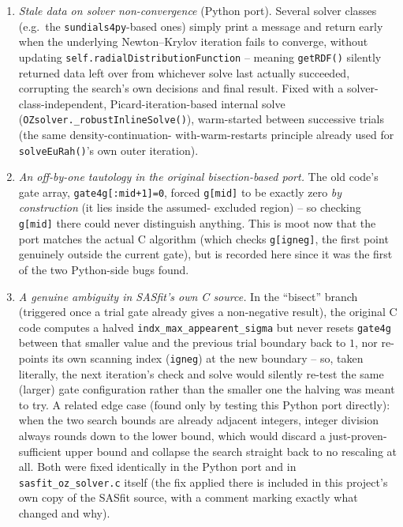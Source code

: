 \documentclass[11pt,a4paper]{article}
\newcommand{\code}[1]{\texttt{#1}}
\begin{document}
\begin{enumerate}[nosep]
  \item \emph{Stale data on solver non-convergence} (Python port). Several
    solver classes (e.g.\ the \code{sundials4py}-based ones) simply print a
    message and return early when the underlying Newton--Krylov iteration
    fails to converge, without updating \code{self.radialDistributionFunction}
    -- meaning \code{getRDF()} silently returned data left over from
    whichever solve last actually succeeded, corrupting the search's own
    decisions and final result. Fixed with a solver-class-independent,
    Picard-iteration-based internal solve (\code{OZsolver.\_robustInlineSolve()}),
    warm-started between successive trials (the same density-continuation-
    with-warm-restarts principle already used for \code{solveEuRah()}'s own
    outer iteration).
  \item \emph{An off-by-one tautology in the original bisection-based port.}
    The old code's gate array, \code{gate4g[:mid+1]=0}, forced \code{g[mid]}
    to be exactly zero \emph{by construction} (it lies inside the assumed-
    excluded region) -- so checking \code{g[mid]} there could never
    distinguish anything. This is moot now that the port matches the actual
    C algorithm (which checks \code{g[igneg]}, the first point genuinely
    outside the current gate), but is recorded here since it was the first
    of the two Python-side bugs found.
  \item \emph{A genuine ambiguity in SASfit's own C source.} In the
    ``bisect'' branch (triggered once a trial gate already gives a
    non-negative result), the original C code computes a halved
    \code{indx\_max\_appearent\_sigma} but never resets \code{gate4g} between
    that smaller value and the previous trial boundary back to $1$, nor
    re-points its own scanning index (\code{igneg}) at the new boundary --
    so, taken literally, the next iteration's check and solve would silently
    re-test the same (larger) gate configuration rather than the smaller one
    the halving was meant to try. A related edge case (found only by testing
    this Python port directly): when the two search bounds are already
    adjacent integers, integer division always rounds down to the lower
    bound, which would discard a just-proven-sufficient upper bound and
    collapse the search straight back to no rescaling at all. Both were
    fixed identically in the Python port and in \code{sasfit\_oz\_solver.c}
    itself (the fix applied there is included in this project's own copy of
    the SASfit source, with a comment marking exactly what changed and why).
\end{enumerate}
\end{document}
